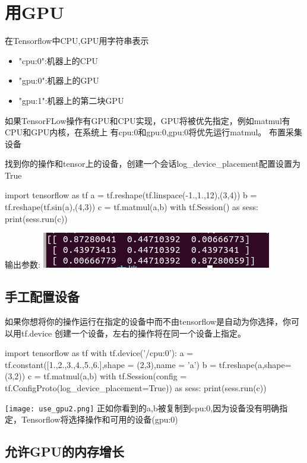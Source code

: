 \section{用GPU}
在Tensorflow中CPU,GPU用字符串表示
\begin{itemize}
\item "cpu:0":机器上的CPU
\item "gpu:0":机器上的GPU
\item "gpu:1":机器上的第二块GPU
\end{itemize}
 如果TensorFLow操作有GPU和CPU实现，GPU将被优先指定，例如matmul有CPU和GPU内核，在系统上 有cpu:0和gpu:0,gpu:0将优先运行matmul。
布置采集设备

找到你的操作和tensor上的设备，创建一个会话log\_device\_placement配置设置为True
\begin{python}
import tensorflow as tf
a = tf.reshape(tf.linspace(-1.,1.,12),(3,4))
b = tf.reshape(tf.sin(a),(4,3))
c = tf.matmul(a,b)
with tf.Session() as sess:
    print(sess.run(c))
\end{python}
输出参数:\newline
\includegraphics{./pic/chapter2/use_gpu1.png}\newline
\subsection{手工配置设备}
如果你想将你的操作运行在指定的设备中而不由tensorflow是自动为你选择，你可以用tf.device 创建一个设备，左右的操作将在同一个设备上指定。
\begin{python}
import tensorflow as tf
with tf.device('/cpu:0'):
    a = tf.constant([1.,2.,3.,4.,5.,6.],shape = (2,3),name = 'a')
    b = tf.reshape(a,shape=(3,2))
    c = tf.matmul(a,b)
    with tf.Session(config = tf.ConfigProto(log_device_placement=True)) as sess:
        print(sess.run(c))
\end{python}
\texttt{[image: use\_gpu2.png]}\newline
正如你看到的a,b被复制到cpu:0,因为设备没有明确指定，Tensorflow将选择操作和可用的设备(gpu:0)

\subsection{允许GPU的内存增长}

